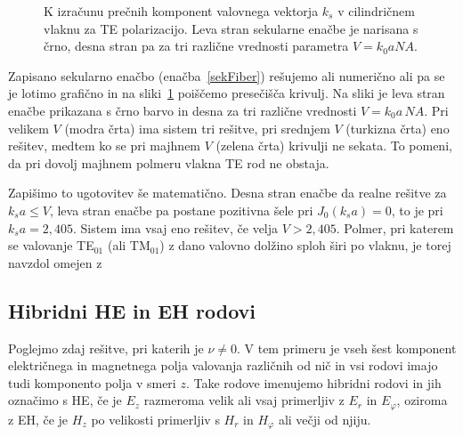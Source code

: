 \begin{figure}[ht]
\centering
\def\svgwidth{65truemm} 

\caption{K izračunu prečnih komponent valovnega vektorja $k_s$ v 
cilindričnem vlaknu za TE polarizacijo.
Leva stran sekularne enačbe je narisana s črno, desna stran pa za tri različne vrednosti parametra 
$V=k_0aNA$.}
\label{fig:TEsecFib}
\end{figure}
Zapisano sekularno enačbo (enačba~\ref{sekFiber}) rešujemo ali numerično ali pa se je lotimo grafično in 
na sliki~\ref{fig:TEsecFib} poiščemo presečišča krivulj. Na sliki je leva stran enačbe prikazana
s črno barvo in desna za tri različne vrednosti $V= k_0 a\,NA$. Pri velikem $V$ (modra črta) ima sistem tri 
rešitve, pri srednjem $V$ (turkizna črta) eno rešitev, medtem ko se pri majhnem $V$ (zelena črta) 
krivulji ne sekata. To pomeni, da pri dovolj majhnem polmeru vlakna TE rod ne obstaja. 

Zapišimo to ugotovitev še matematično. Desna stran enačbe da realne rešitve za 
$k_s a \le  V$, leva stran enačbe pa postane pozitivna šele pri 
$J_0 (k_s a)  = 0$, to je pri $k_s a= 2,405$. Sistem ima vsaj eno rešitev, če velja
$V>2,405$. Polmer, pri katerem se valovanje TE$_{01}$ (ali TM$_{01}$) 
z dano valovno dolžino sploh širi po vlaknu, je torej navzdol omejen z 

\subsection*{Hibridni HE in EH rodovi}
Poglejmo zdaj rešitve, pri katerih je $\nu \neq 0$. V tem primeru je 
vseh šest komponent električnega in magnetnega polja valovanja različnih od nič in vsi rodovi
imajo tudi komponento polja v smeri $z$. Take rodove imenujemo hibridni rodovi in jih 
označimo s HE, če je $E_z$ razmeroma velik ali vsaj primerljiv z $E_r$ in $E_\varphi$, 
oziroma z EH, če je $H_z$ po velikosti primerljiv s $H_r$ in $H_\varphi$ ali večji od njiju. 

